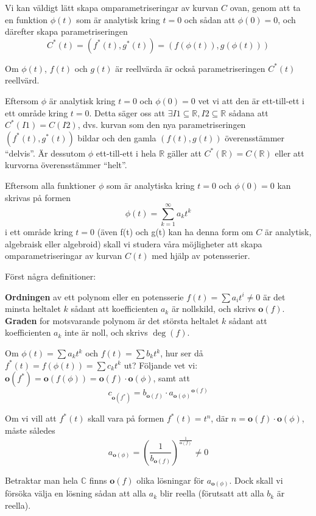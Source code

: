 Vi kan väldigt lätt skapa omparametriseringar av kurvan $C$ ovan, genom
att ta en funktion $\phi(t)$ som är analytisk kring $t = 0$ och sådan att $\phi(0) = 0$, och därefter skapa parametriseringen \[C^*(t) = (f^*(t), g^*(t)) = (f(\phi(t)), g(\phi(t)))\]

Om $\phi(t)$, $f(t)$ och $g(t)$ är reellvärda är också parametriseringen $C^*(t)$ reellvärd.

Eftersom $\phi$ är analytisk kring $t = 0$ och $\phi(0) = 0$ vet vi att den är ett-till-ett i ett område kring $t = 0$. Detta säger oss att $\exists I1 \subseteq \mathbb{R}, I2 \subseteq \mathbb{R}$ sådana att $C^*(I1) = C(I2)$, dvs. kurvan som den nya parametriseringen $(f^*(t), g^*(t))$ bildar och den gamla $(f(t), g(t))$ överensstämmer ``delvis''. Är dessutom $\phi$ ett-till-ett i hela $\mathbb{R}$ gäller att $C^*(\mathbb{R}) = C(\mathbb{R})$ eller att kurvorna överensstämmer ``helt''.

Eftersom alla funktioner $\phi$ som är analytiska kring $t = 0$ och $\phi(0) = 0$ kan skrivas på formen \[\phi(t)=\sum_{k=1}^{\infty}a_k t^k\] i ett område kring $t = 0$ (även f(t) och g(t) kan ha denna form om $C$ är analytisk, algebraisk eller algebroid) skall vi studera våra möjligheter att skapa omparametriseringar av kurvan $C(t)$ med hjälp av potensserier.

Först några definitioner:

\begin{Definition}
\textbf{Ordningen} av ett polynom eller en potensserie $f(t) =
\sum a_i t^i \neq 0$ är det minsta heltalet $k$ sådant att koefficienten $a_k$ är nollskild, och skrivs $\mathbf{o}(f)$. \textbf{Graden} for motsvarande polynom är det största heltalet $k$ sådant att koefficienten $a_k$ inte är noll, och skrivs $\deg(f)$.
\end{Definition}

Om $\phi(t) = \sum a_k t^k$ och $f(t) = \sum b_k t^k$, hur ser då $f^*(t) = f(\phi(t)) = \sum c_k t^k$ ut? Följande vet vi: $\mathbf{o}(f^*) = \mathbf{o}(f(\phi)) = \mathbf{o}(f) \cdot \mathbf{o}(\phi)$, samt att \[c_{\mathbf{o}(f^*)}=b_{\mathbf{o}(f)} \cdot {a_{\mathbf{o}(\phi)}}^{\mathbf{o}(f)}\]

Om vi vill att $f^*(t)$ skall vara på formen $f^*(t) = t^n$, där $n = \mathbf{o}(f) \cdot \mathbf{o}(\phi)$, måste således \[a_{\mathbf{o}(\phi)} = \left(\frac{1}{b_{\mathbf{o}(f)}}\right)^\frac{1}{\mathbf{o}(f)} \neq 0\]

Betraktar man hela $\mathbb{C}$ finns $\mathbf{o}(f)$ olika lösningar för $a_{\mathbf{o}(\phi)}$. Dock skall vi försöka välja en lösning sådan att alla $a_k$ blir reella (förutsatt att alla $b_k$ är reella).

